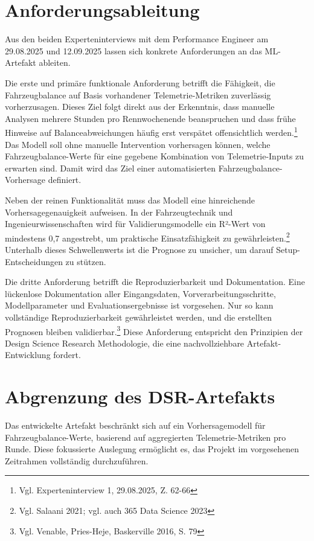 \section{Anforderungsableitung}

Aus den beiden Experteninterviews mit dem Performance Engineer am 29.08.2025 und 12.09.2025 lassen sich konkrete Anforderungen an das \ac{ML}-Artefakt ableiten.

Die erste und primäre funktionale Anforderung betrifft die Fähigkeit, die Fahrzeugbalance auf Basis vorhandener Telemetrie-Metriken zuverlässig vorherzusagen. Dieses Ziel folgt direkt aus der Erkenntnis, dass manuelle Analysen mehrere Stunden pro Rennwochenende beanspruchen und dass frühe Hinweise auf Balanceabweichungen häufig erst verspätet offensichtlich werden.\footnote{Vgl. Experteninterview 1, 29.08.2025, Z. 62-66} Das Modell soll ohne manuelle Intervention vorhersagen können, welche Fahrzeugbalance-Werte für eine gegebene Kombination von Telemetrie-Inputs zu erwarten sind. Damit wird das Ziel einer automatisierten Fahrzeugbalance-Vorhersage definiert.

Neben der reinen Funktionalität muss das Modell eine hinreichende 
Vorhersagegenauigkeit aufweisen. In der Fahrzeugtechnik und 
Ingenieurwissenschaften wird für Validierungsmodelle ein R²-Wert 
von mindestens 0,7 angestrebt, um praktische Einsatzfähigkeit 
zu gewährleisten.\footnote{Vgl. Salaani 2021; vgl. auch 365 Data Science 2023} 
Unterhalb dieses Schwellenwerts ist die Prognose zu unsicher, 
um darauf Setup-Entscheidungen zu stützen.

Die dritte Anforderung betrifft die Reproduzierbarkeit und Dokumentation. Eine lückenlose Dokumentation aller Eingangsdaten, Vorverarbeitungsschritte, Modellparameter und Evaluationsergebnisse ist vorgesehen. Nur so kann vollständige Reproduzierbarkeit gewährleistet werden, und die erstellten Prognosen bleiben validierbar.\footnote{Vgl. Venable, Pries-Heje, Baskerville 2016, S. 79} Diese Anforderung entspricht den Prinzipien der Design Science Research Methodologie, die eine nachvollziehbare Artefakt-Entwicklung fordert.

\section{Abgrenzung des DSR-Artefakts}

Das entwickelte Artefakt beschränkt sich auf ein Vorhersagemodell für Fahrzeugbalance-Werte, basierend auf aggregierten Telemetrie-Metriken pro Runde. Diese fokussierte Auslegung ermöglicht es, das Projekt im vorgesehenen Zeitrahmen vollständig durchzuführen.

